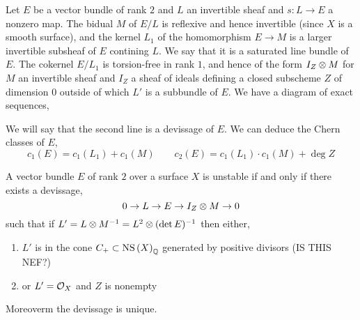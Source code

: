 \documentclass[12pt]{article}
\begin{document}
Let $E$ be a vector bundle of rank $2$ and $L$ an invertible sheaf and $s : L \to E$ a nonzero map. The bidual $M$ of $E/L$ is reflexive and hence invertible (since $X$ is a smooth surface), and the kernel $L_1$ of the homomorphism $E \to M$ is a larger invertible subsheaf of $E$ contining $L$. We say that it is a saturated line bundle of $E$. The cokernel $E/L_1$ is torsion-free in rank $1$, and hence of the form $I_Z \otimes M$ for $M$ an invertible sheaf and $I_Z$ a sheaf of ideals defining a closed subscheme $Z$ of dimension $0$ outside of which $L'$ is a subbundle of $E$. We have a diagram of exact sequences,
\begin{center}
\end{center} 
We will say that the second line is a devissage of $E$. We can deduce the Chern classes of $E$,
\[ c_1(E) = c_1(L_1) + c_1(M) \quad \quad c_2(E) = c_1(L_1) \cdot c_1(M) + \deg{Z} \]

\begin{theorem}
A vector bundle $E$ of rank $2$ over a surface $X$ is unstable if and only if there exists a devissage,
\[ 0 \to L \to E \to I_Z \otimes M \to 0 \]
such that if $L' = L \otimes M^{-1} = L^2 \otimes (\det{E})^{-1}$ then either,
\begin{enumerate}
\item $L'$ is in the cone $C_+ \subset \mathrm{NS}\left( X \right)_{\mathbb{Q}}$ generated by positive divisors (IS THIS NEF?)
\item or $L' = \mathcal{O}_{X}$ and $Z$ is nonempty
\end{enumerate}
Moreoverm the devissage is unique.
\end{theorem}
\end{document}
